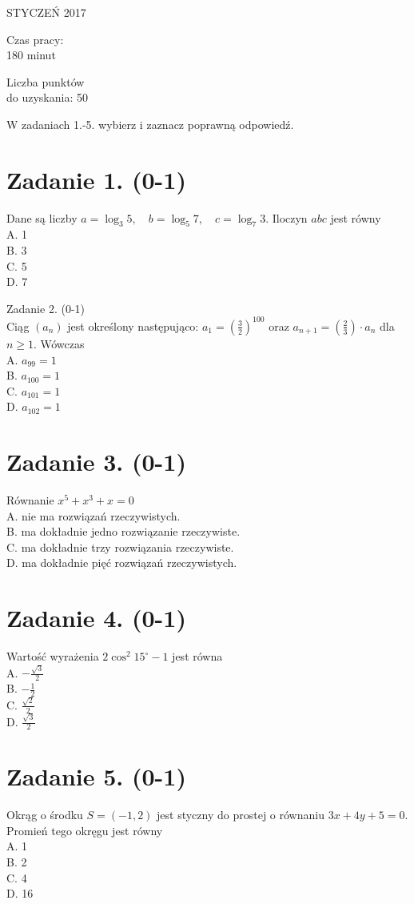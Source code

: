 \documentclass[10pt]{article}
\begin{document}
STYCZEŃ 2017

Czas pracy:\\
180 minut

Liczba punktów\\
do uzyskania: 50

W zadaniach 1.-5. wybierz i zaznacz poprawną odpowiedź.

\section*{Zadanie 1. (0-1)}
Dane są liczby \(a=\log _{3} 5, \quad b=\log _{5} 7, \quad c=\log _{7} 3\). Iloczyn \(a b c\) jest równy\\
A. 1\\
B. 3\\
C. 5\\
D. 7

Zadanie 2. (0-1)\\
Ciąg \(\left(a_{n}\right)\) jest określony następująco: \(a_{1}=\left(\frac{3}{2}\right)^{100}\) oraz \(a_{n+1}=\left(\frac{2}{3}\right) \cdot a_{n}\) dla \(n \geqslant 1\). Wówczas\\
A. \(a_{99}=1\)\\
B. \(a_{100}=1\)\\
C. \(a_{101}=1\)\\
D. \(a_{102}=1\)

\section*{Zadanie 3. (0-1)}
Równanie \(x^{5}+x^{3}+x=0\)\\
A. nie ma rozwiązań rzeczywistych.\\
B. ma dokładnie jedno rozwiązanie rzeczywiste.\\
C. ma dokładnie trzy rozwiązania rzeczywiste.\\
D. ma dokładnie pięć rozwiązań rzeczywistych.

\section*{Zadanie 4. (0-1)}
Wartość wyrażenia \(2 \cos ^{2} 15^{\circ}-1\) jest równa\\
A. \(-\frac{\sqrt{3}}{2}\)\\
B. \(-\frac{1}{2}\)\\
C. \(\frac{\sqrt{2}}{2}\)\\
D. \(\frac{\sqrt{3}}{2}\)

\section*{Zadanie 5. (0-1)}
Okrąg o środku \(S=(-1,2)\) jest styczny do prostej o równaniu \(3 x+4 y+5=0\). Promień tego okręgu jest równy\\
A. 1\\
B. 2\\
C. 4\\
D. 16
\end{document}
